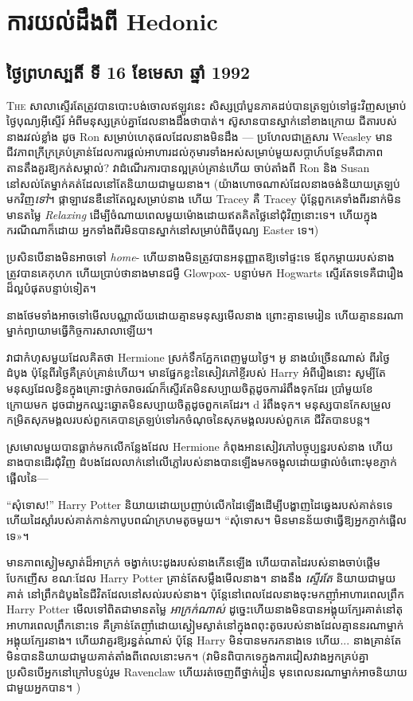 \chapter{ការយល់ដឹងពី Hedonic}

\section{ថ្ងៃព្រហស្បតិ៍ ទី 16 ខែមេសា ឆ្នាំ 1992}

\lettrine{T}{he} សាលាស្ទើរតែត្រូវបានបោះបង់ចោលឥឡូវនេះ សិស្សប្រាំបួនភាគដប់បានត្រឡប់ទៅផ្ទះវិញសម្រាប់ថ្ងៃបុណ្យអ៊ីស្ទើរ៍ អំពីមនុស្សគ្រប់គ្នាដែលនាងដឹងថាបាត់។ ស៊ូសានបានស្នាក់នៅខាងក្រោយ ជីតារបស់នាងរវល់ខ្លាំង ដូច Ron សម្រាប់ហេតុផលដែលនាងមិនដឹង — ប្រហែលជាគ្រួសារ Weasley មានជីវភាពក្រីក្រគ្រប់គ្រាន់ដែលការផ្តល់អាហារដល់កុមារទាំងអស់សម្រាប់មួយសប្តាហ៍បន្ថែមគឺជាភាពតានតឹងគួរឱ្យកត់សម្គាល់? វាដំណើរការបានល្អគ្រប់គ្រាន់ហើយ ចាប់តាំងពី Ron និង Susan នៅសល់តែម្នាក់គត់ដែលនៅតែនិយាយជាមួយនាង។ (យ៉ាងហោចណាស់ដែលនាងចង់និយាយត្រឡប់មកវិញ\emph{ទៅ}។ ផ្កាឡាវេនឌឺនៅតែល្អសម្រាប់នាង ហើយ Tracey គឺ Tracey ប៉ុន្តែពួកគេទាំងពីរនាក់មិនមានតម្លៃ \emph{Relaxing} ដើម្បីចំណាយពេលមួយម៉ោងដោយឥតគិតថ្លៃនៅជុំវិញនោះទេ។ ហើយក្នុងករណីណាក៏ដោយ អ្នកទាំងពីរមិនបានស្នាក់នៅសម្រាប់ពិធីបុណ្យ Easter ទេ។)

ប្រសិនបើនាងមិនអាចទៅ \emph{home}- ហើយនាងមិនត្រូវបានអនុញ្ញាតឱ្យទៅផ្ទះទេ ឪពុកម្តាយរបស់នាងត្រូវបានគេកុហក ហើយប្រាប់ថានាងមានជម្ងឺ Glowpox- បន្ទាប់មក Hogwarts ស្ទើរតែទទេគឺជារឿងដ៏ល្អបំផុតបន្ទាប់ទៀត។

នាងថែមទាំងអាចទៅមើលបណ្ណាល័យដោយគ្មានមនុស្សមើលនាង ព្រោះគ្មានមេរៀន ហើយគ្មាននរណាម្នាក់ព្យាយាមធ្វើកិច្ចការសាលាឡើយ។

វា​ជា​កំហុស​មួយ​ដែល​គិត​ថា Hermione ស្រក់​ទឹក​ភ្នែក​ពេញ​មួយ​ថ្ងៃ។ អូ នាងយំច្រើនណាស់ ពីរថ្ងៃដំបូង ប៉ុន្តែពីរថ្ងៃគឺគ្រប់គ្រាន់ហើយ។ មានផ្នែកខ្លះនៃសៀវភៅខ្ចីរបស់ Harry អំពីរឿងនោះ សូម្បីតែមនុស្សដែលខ្វិនក្នុងគ្រោះថ្នាក់ចរាចរណ៍ក៏ស្ទើរតែមិនសប្បាយចិត្តដូចការរំពឹងទុកដែរ ប្រាំមួយខែក្រោយមក ដូចជាអ្នកឈ្នះឆ្នោតមិនសប្បាយចិត្តដូចពួកគេដែរ។ d រំពឹងទុក។ មនុស្ស​បាន​កែ​សម្រួល កម្រិត​សុភមង្គល​របស់​ពួក​គេ​បាន​ត្រឡប់​ទៅ​រក​ចំណុច​នៃ​សុភមង្គល​របស់​ពួក​គេ ជីវិត​បាន​បន្ត។

ស្រមោលមួយបានធ្លាក់មកលើកន្លែងដែល Hermione កំពុងអានសៀវភៅបច្ចុប្បន្នរបស់នាង ហើយនាងបានដើរជុំវិញ ដំបងដែលលាក់នៅលើភ្លៅរបស់នាងបានឡើងមកចង្អុលដោយផ្ទាល់ចំពោះមុខភ្ញាក់ផ្អើលនៃ—

“សុំទោស!” Harry Potter និយាយដោយប្រញាប់លើកដៃឡើងដើម្បីបង្ហាញដៃឆ្វេងរបស់គាត់ទទេ ហើយដៃស្តាំរបស់គាត់កាន់កាបូបពណ៌ក្រហមតូចមួយ។ “សុំទោស។ មិន​មាន​ន័យ​ថា​ធ្វើ​ឱ្យ​អ្នក​ភ្ញាក់​ផ្អើល​ទេ»។

មានភាពស្ងៀមស្ងាត់ដ៏អាក្រក់ ចង្វាក់បេះដូងរបស់នាងកើនឡើង ហើយបាតដៃរបស់នាងចាប់ផ្តើមបែកញើស ខណៈដែល Harry Potter គ្រាន់តែសម្លឹងមើលនាង។ នាងនឹង \emph{ស្ទើរតែ} និយាយជាមួយគាត់ នៅព្រឹកដំបូងនៃជីវិតដែលនៅសល់របស់នាង។ ប៉ុន្តែនៅពេលដែលនាងចុះមកញ៉ាំអាហារពេលព្រឹក Harry Potter មើលទៅពិតជាមានតម្លៃ \emph{អាក្រក់ណាស់} ដូច្នេះហើយនាងមិនបានអង្គុយក្បែរគាត់នៅតុអាហារពេលព្រឹកនោះទេ គឺគ្រាន់តែញ៉ាំដោយស្ងៀមស្ងាត់នៅក្នុងពពុះតូចរបស់នាងដែលគ្មាននរណាម្នាក់អង្គុយក្បែរនាង។ ហើយវាគួរឱ្យរន្ធត់ណាស់ ប៉ុន្តែ Harry មិនបានមករកនាងទេ ហើយ... នាងគ្រាន់តែមិនបាននិយាយជាមួយគាត់តាំងពីពេលនោះមក។ (វាមិនពិបាកទេក្នុងការជៀសវាងអ្នកគ្រប់គ្នា ប្រសិនបើអ្នកនៅក្រៅបន្ទប់រួម Ravenclaw ហើយរត់ចេញពីថ្នាក់រៀន មុនពេលនរណាម្នាក់អាចនិយាយជាមួយអ្នកបាន។ )

